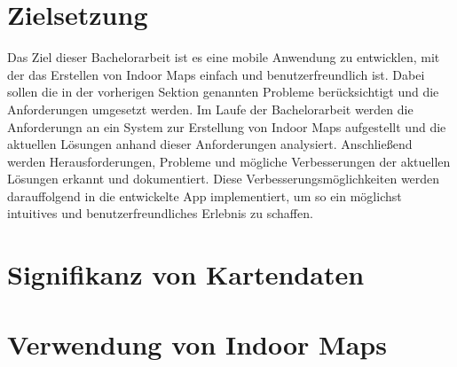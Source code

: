 \section{Zielsetzung}
Das Ziel dieser Bachelorarbeit ist es eine mobile Anwendung zu entwicklen, mit der das Erstellen von Indoor Maps einfach und benutzerfreundlich ist. Dabei sollen die in der vorherigen Sektion genannten Probleme berücksichtigt und die Anforderungen umgesetzt werden. Im Laufe der Bachelorarbeit werden die Anforderungn an ein System zur Erstellung von Indoor Maps aufgestellt und die aktuellen Lösungen anhand dieser Anforderungen analysiert. Anschließend werden Herausforderungen, Probleme und mögliche Verbesserungen der aktuellen Lösungen erkannt und dokumentiert. Diese Verbesserungsmöglichkeiten werden darauffolgend in die entwickelte App implementiert, um so ein möglichst intuitives und benutzerfreundliches Erlebnis zu schaffen.%
%
\section{Signifikanz von Kartendaten}
%
\section{Verwendung von Indoor Maps}
